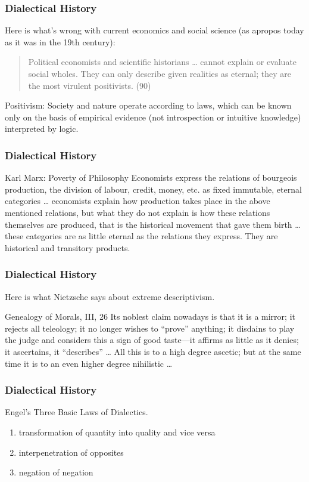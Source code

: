 \documentclass[xcolor=dvipsnames]{beamer}
\begin{document}
\begin{frame}
  \frametitle{Dialectical History}
  Here is what's wrong with current economics and social science (as
  apropos today as it was in the 19th century):
  \begin{quote}
    Political economists and scientific historians {\ldots} cannot
    explain or evaluate social wholes. They can only describe given
    realities as eternal; they are the most virulent positivists. (90)
  \end{quote}
  \alert{Positivism:} Society and nature operate according to laws,
  which can be known only on the basis of empirical evidence (not
  introspection or intuitive knowledge) interpreted by logic.
\end{frame}

\begin{frame}
  \frametitle{Dialectical History}
  \begin{block}{Karl Marx: Poverty of Philosophy}
    Economists express the relations of bourgeois production, the
    division of labour, credit, money, etc. as fixed immutable,
    eternal categories {\ldots} economists explain how production
    takes place in the above mentioned relations, but what they do not
    explain is how these relations themselves are produced, that is
    the historical movement that gave them birth {\ldots} these
    categories are as little eternal as the relations they express.
    They are historical and transitory products.
  \end{block}
\end{frame}

\begin{frame}
  \frametitle{Dialectical History}
  Here is what Nietzsche says about extreme descriptivism.
  \begin{block}{Genealogy of Morals, III, 26}
    Its noblest claim nowadays is that it is a mirror; it rejects all
    teleology; it no longer wishes to ``prove'' anything; it disdains
    to play the judge and considers this a sign of good taste---it
    affirms as little as it denies; it ascertains, it ``describes''
    {\ldots} All this is to a high degree ascetic; but at the same
    time it is to an even higher degree nihilistic {\ldots}
  \end{block}
\end{frame}

\begin{frame}
  \frametitle{Dialectical History}
  Engel's Three Basic Laws of Dialectics.
  \begin{enumerate}
  \item transformation of quantity into quality and vice versa
  \item interpenetration of opposites
  \item negation of negation
  \end{enumerate}
\end{frame}
\end{document}
